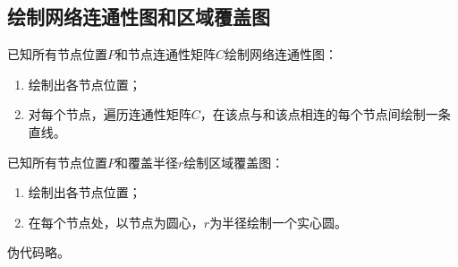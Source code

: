 \documentclass[a4paper]{ctexart}
\begin{document}
\begin{spacing}{1}
		\subsection{绘制网络连通性图和区域覆盖图}
		已知所有节点位置$P$和节点连通性矩阵$C$绘制网络连通性图：
		\begin{enumerate}
			\item 绘制出各节点位置；
			\item 对每个节点，遍历连通性矩阵$C$，在该点与和该点相连的每个节点间绘制一条直线。
		\end{enumerate}
		已知所有节点位置$P$和覆盖半径$r$绘制区域覆盖图：
		\begin{enumerate}
			\item 绘制出各节点位置；
			\item 在每个节点处，以节点为圆心，$r$为半径绘制一个实心圆。
		\end{enumerate}
		伪代码略。


\end{spacing}
\end{document}
